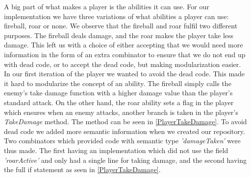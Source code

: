A big part of what makes a player is the abilities it can use. For our implementation we have three variations of what abilities a player can use: fireball, roar or none. We observe that the fireball and roar fulfil two different purposes. The fireball deals damage, and the roar makes the player take less damage. This left us with a choice of either accepting that we would need more information in the form of an extra combinator to ensure that we do not end up with dead code, or to accept the dead code, but making modularization  easier.\\
In our first iteration of the player we wanted to avoid the dead code. This made it hard to modularize the concept of an ability. The fireball simply calls the enemy's take damage function with a higher damage value than the player's standard attack. On the other hand, the roar ability sets a flag in the player which ensures when an enemy attacks, another branch is taken in the player's \textit{TakeDamage} method. The method can be seen in \autoref{PlayerTakeDamage}. To avoid dead code we added more semantic information when we created our repository. Two combinators which provided code with semantic type \textit{'damageTaken'} were thus made. The first having an implementation which did not use the field \textit{'roarActive'} and only had a single line for taking damage, and the second having the full if statement as seen in \autoref{PlayerTakeDamage}.

